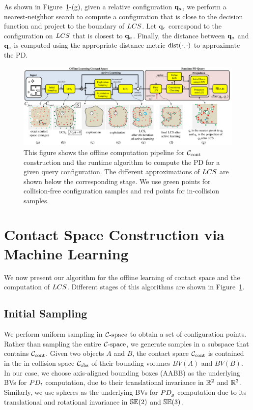 As shown in Figure~\ref{fig:2:pipeline}-(g), given a relative configuration $\mathbf q_a$, we perform
a nearest-neighbor search to compute a configuration that is close to the decision function and project
to the boundary of $LCS$. Let $\mathbf q_c$ correspond
to the configuration on $LCS$ that is closest to $\mathbf q_a$.
Finally, the distance between $\mathbf q_a$ and $\mathbf q_c$ is computed using the appropriate distance metric $\operatorname{dist}(\cdot, \cdot)$ to approximate the PD.


\begin{figure}[htb]
  \centering
  \includegraphics[width=\linewidth]{figs/2/pipeline.pdf}
  \caption[Offline computation pipeline for $\Ccont$ construction and the runtime algorithm to compute the PD for a given query configuration]{This figure shows the offline computation pipeline for $\Ccont$ construction and the runtime algorithm to compute the PD for a given query configuration. The different approximations of $LCS$ are shown below the corresponding stage. We use green points for collision-free configuration samples and red points for in-collision samples.}
  \label{fig:2:pipeline}
\end{figure}

\section{Contact Space Construction via Machine Learning}
\label{sec:2:learning}
We now present our algorithm for the offline learning of contact space and the computation of $LCS$. Different stages of this algorithms
are shown in Figure~\ref{fig:2:pipeline}.

\subsection{Initial Sampling}
\label{sec:2:offline:uniform}

We perform uniform sampling in $\mathcal C\text{-space}$ to obtain a set of configuration points.  Rather than sampling the entire $\mathcal C\text{-space}$,
we generate samples in a subspace that contains $\Ccont$. Given two objects $A$ and $B$, the contact space $\Ccont$ is contained in the
in-collision space $\mathcal C_{\text{obs}}$ of their bounding volumes $BV(A)$ and $BV(B)$. In our case, we choose
axis-aligned bounding boxes (AABB) as the underlying BVs for $PD_t$
computation, due to their translational invariance in $\mathbb R^2$
and $\mathbb R^3$. Similarly, we use spheres as the underlying BVs for $PD_g$
computation due to its translational and rotational invariance in
$\mathbb {SE}(2)$ and $\mathbb {SE}(3)$.


